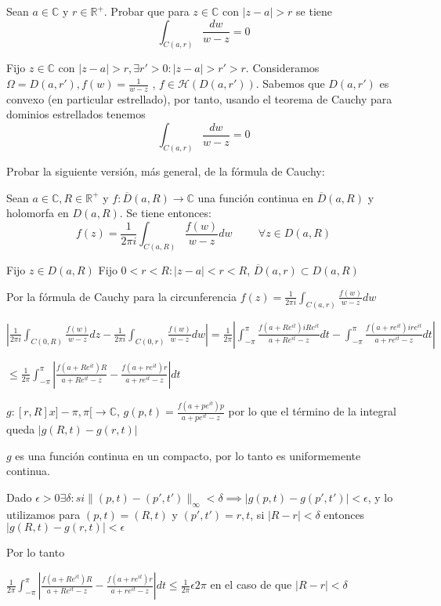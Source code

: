 
\begin{ejer}
	Sean $a\in\mathbb{C}$ y $r\in\mathbb{R}^+$. Probar que para $z\in\mathbb{C}$ con $|z-a|>r$ se tiene
	$$ \int_{C(a,r)} \frac{dw}{w-z} = 0 $$
\end{ejer}
\begin{sol}
Fijo $z\in\mathbb{C}$ con $|z-a|>r, \exists r'>0 : |z-a|>r'>r$.
Consideramos $\Omega = D(a,r'), f(w) = \frac{1}{w-z}$ , $f\in\mathcal{H}(D(a,r'))$. Sabemos que $D(a,r')$ es convexo (en particular estrellado), por tanto, usando el teorema de Cauchy para dominios estrellados tenemos %
$$\int_{C(a,r)} \frac{dw}{w-z} = 0$$
\end{sol}


\begin{ejer}
	Probar la siguiente versión, más general, de la fórmula de Cauchy:
	
	Sean $a\in\mathbb{C},R\in\mathbb{R}^+$ y $f:\overline{D}(a,R) \rightarrow \mathbb{C}$ una función continua en $\overline{D}(a,R)$ y holomorfa en $D(a,R)$. Se tiene entonces:
	$$ f(z) = \frac{1}{2\pi i} \int_{C(a,R)} \frac{f(w)}{w-z}dw \hspace{1cm} \forall z\in D(a,R) $$
\end{ejer}

\begin{sol}

Fijo $z\in D(a,R)$
Fijo $0<r<R : |z-a|<r<R$, $\overline{D}(a,r) \subset D(a,R)$

Por la fórmula de Cauchy para la circunferencia $f(z) = \frac{1}{2\pi i} \int_{C(a,r)} \frac{f(w)}{w-z} dw$

$ \left|\frac{1}{2\pi i} \int_{C(0,R)} \frac{f(w)}{w-z} dz - \frac{1}{2\pi i} \int_{C(0,r)} \frac{f(w)}{w-z}dw \right| = \frac{1}{2\pi} |\int_{-\pi}^{\pi} \frac{f(a+Re^{it}) iRe^{it} }{ a+Re^{it}-z } dt - \int_{-\pi}^{\pi} \frac{f(a+re^{it}) ire^{it}}{a+re^{it}-z} dt|$

$\leq \frac{1}{2\pi} \int_{-\pi}^{\pi} \left| \frac{f(a+Re^{it})R}{a+Re^{it}-z} -\frac{f(a+re^{it})r}{a+re^{it}-z} \right| dt$

$g:[r,R]x]-\pi, \pi[ \rightarrow \mathbb{C}$,
$g(p,t) = \frac{f(a+pe^{it})p}{a+pe^{it}-z}$
por lo que el término de la integral queda $|g(R,t)-g(r,t)|$

$g$ es una función continua en un compacto, por lo tanto es uniformemente continua.

Dado $\epsilon >0 \exists \delta : si \| (p,t)-(p',t') \| _{\infty}<\delta \implies |g(p,t)-g(p',t')| < \epsilon$,
y lo utilizamos para $(p,t)=(R,t)$ y $(p',t')=r,t$, si $|R-r|<\delta$ entonces $|g(R,t)-g(r,t)| < \epsilon$

Por lo tanto

$\frac{1}{2\pi} \int_{-\pi}^{\pi} \left| \frac{f(a+Re^{it})R}{a+Re^{it}-z} -\frac{f(a+re^{it})r}{a+re^{it}-z} \right| dt \leq \frac{1}{2\pi}\epsilon 2\pi$ en el caso de que $|R-r|<\delta$

\end{sol}


